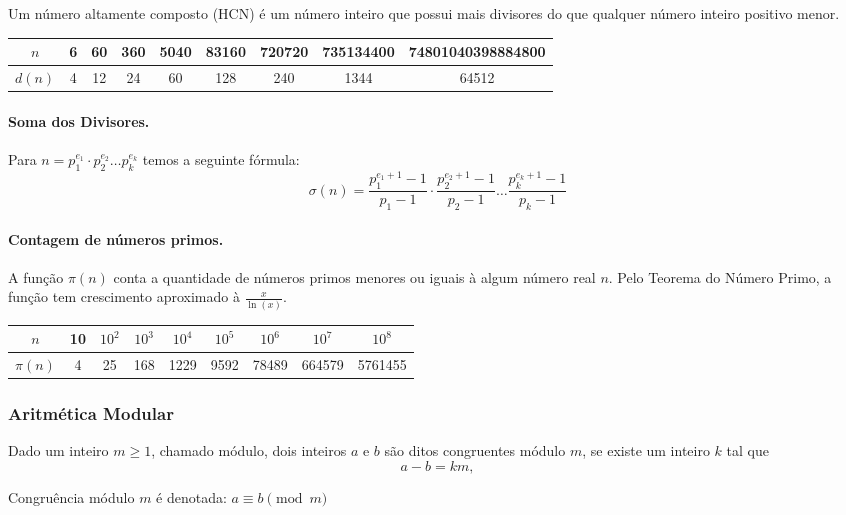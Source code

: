Um número altamente composto (HCN) é um número inteiro que possui mais divisores do que qualquer número inteiro positivo menor.

\begin{center}
    \begin{tabular}{c|c|c|c|c|c|c|c|c}
        $n$ & 6 & 60&360&5040&83160&720720&735134400&74801040398884800 \\
        \hline
        $d(n)$ & 4&12&24&60&128&240&1344&64512
    \end{tabular}
\end{center}

\paragraph{Soma dos Divisores.} Para $n = p_1^{e_1}\cdot p_2^{e_2}\dots p_k^{e_k}$ temos a seguinte fórmula:
$$\sigma(n) = \frac{p_1^{e_1+1}-1}{p_1-1} \cdot \frac{p_2^{e_2+1}-1}{p_2-1}  \dots  \frac{p_k^{e_k+1}-1}{p_k-1}$$

\paragraph{Contagem de números primos.} A função $\pi(n)$ conta a quantidade de números primos menores ou iguais à algum número real $n$. Pelo Teorema do Número Primo, a função tem crescimento aproximado à $\frac{x}{\ln(x)}$.

\begin{center}
    \begin{tabular}{c|c|c|c|c|c|c|c|c}
        $n$ &10&$10^2$&$10^3$&$10^4$&$10^5$&$10^6$&$10^7$&$10^8$ \\
        \hline
        $\pi(n)$ &4&25&168&1229&9592&78489&664579&5761455
        
    \end{tabular}
\end{center}

\subsubsection{Aritmética Modular}
Dado um inteiro $m \ge 1$, chamado módulo, dois inteiros $a$ e $b$ são ditos congruentes módulo $m$, se existe um inteiro $k$ tal que
$$a-b = km,$$

Congruência módulo $m$ é denotada: $a \equiv b \pmod m$


